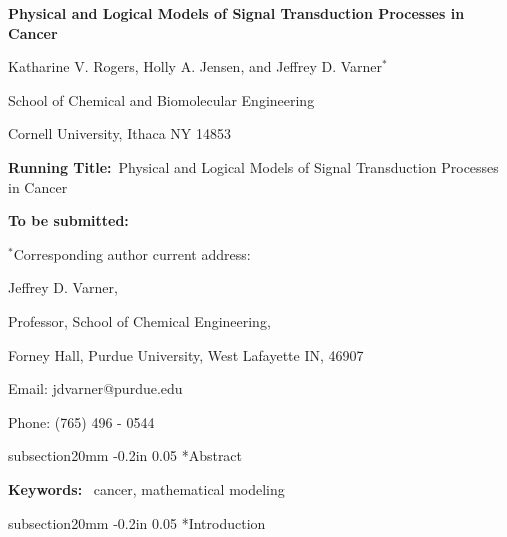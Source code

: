 \documentclass[12pt]{article}
\makeatletter
\renewcommand\section{\@startsection
	{subsection}{2}{0mm}
	{-0.2in}
	{0.05\baselineskip}
	{\normalfont\large\bfseries}}
\makeatother
\begin{document}
\begin{titlepage}
{\par\centering\textbf{\Large Physical and Logical Models of Signal Transduction Processes in Cancer}}
\vspace{0.05in}
{\par \centering \large{ Katharine V. Rogers, Holly A. Jensen,
and Jeffrey D. Varner$^{*}$}}
\vspace{0.10in}
{\par \centering \large{School of Chemical and Biomolecular Engineering}}
{\par \centering \large{Cornell University, Ithaca NY 14853}}
\vspace{0.1in}
{\par \centering \textbf{Running Title:}~Physical and Logical Models of Signal Transduction Processes in Cancer}
\vspace{0.1in}
{\par \centering \textbf{To be submitted:}~\emph{}}
\vspace{0.5in}
{\par \centering $^{*}$Corresponding author current address:}
{\par \centering Jeffrey D. Varner,}
{\par \centering Professor, School of Chemical Engineering,}
{\par {} Forney Hall, Purdue University, West Lafayette IN, 46907}
{\par \centering Email: jdvarner@purdue.edu}
{\par \centering Phone: (765) 496 - 0544}
\end{titlepage}
\date{}
\thispagestyle{empty}
\pagebreak
\section*{Abstract}


\vspace{0.5in}
{\noindent \textbf{Keywords:}~ cancer, mathematical modeling}

\pagebreak

\setcounter{page}{1}

\linenumbers

\section*{Introduction}
\end{document}
